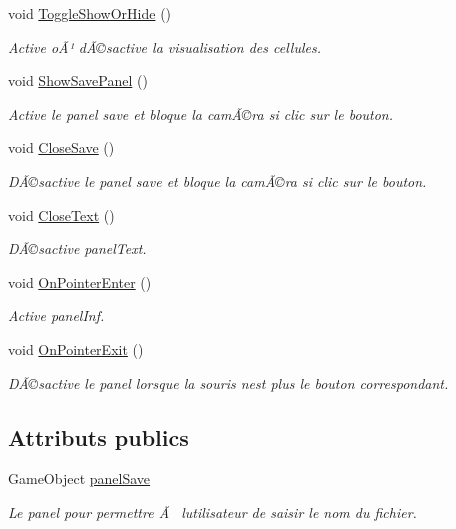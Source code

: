 \begin{DoxyCompactItemize}
void \mbox{\hyperlink{class_menu_visualization_u_i_acc1ed888dd19359811e473ffbd2fa86a}{Toggle\+Show\+Or\+Hide}} ()
\begin{DoxyCompactList}\small\item\em Active oÃ¹ dÃ©sactive la visualisation des cellules. \end{DoxyCompactList}\item 
void \mbox{\hyperlink{class_menu_visualization_u_i_aabfef8a72ef59e04916f6d95a1274431}{Show\+Save\+Panel}} ()
\begin{DoxyCompactList}\small\item\em Active le panel save et bloque la camÃ©ra si clic sur le bouton. \end{DoxyCompactList}\item 
void \mbox{\hyperlink{class_menu_visualization_u_i_a262b9857eed5d1a7e749beb653a88cad}{Close\+Save}} ()
\begin{DoxyCompactList}\small\item\em DÃ©sactive le panel save et bloque la camÃ©ra si clic sur le bouton. \end{DoxyCompactList}\item 
void \mbox{\hyperlink{class_menu_visualization_u_i_a5f689cefeb05b7bfdc19c56179deb6ef}{Close\+Text}} ()
\begin{DoxyCompactList}\small\item\em DÃ©sactive panel\+Text. \end{DoxyCompactList}\item 
void \mbox{\hyperlink{class_menu_visualization_u_i_aeb3cdd54092efba28c3a0c693dd64040}{On\+Pointer\+Enter}} ()
\begin{DoxyCompactList}\small\item\em Active panel\+Inf. \end{DoxyCompactList}\item 
void \mbox{\hyperlink{class_menu_visualization_u_i_a6ebf2452335526b9d63b69ce420d2365}{On\+Pointer\+Exit}} ()
\begin{DoxyCompactList}\small\item\em DÃ©sactive le panel lorsque la souris n\textquotesingle{}est plus le bouton correspondant. \end{DoxyCompactList}\end{DoxyCompactItemize}
\subsection*{Attributs publics}
\begin{DoxyCompactItemize}
\item 
Game\+Object \mbox{\hyperlink{class_menu_visualization_u_i_af538de452b7ce9bd31c5b61a3c3d0886}{panel\+Save}}
\begin{DoxyCompactList}\small\item\em Le panel pour permettre Ã  l\textquotesingle{}utilisateur de saisir le nom du fichier. \end{DoxyCompactList}\end{DoxyCompactItemize}

